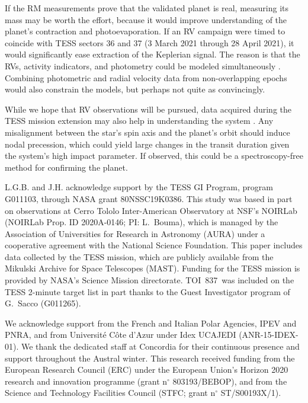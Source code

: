 \documentclass[12pt,twocolumn,tighten]{aastex63}
\newcommand{\tn}{TOI~837} %
\begin{document}
If the RM measurements prove that the validated planet is real,
measuring its mass may be worth the effort, because it would improve
understanding of the planet's contraction and photoevaporation.  If an
RV campaign were timed to coincide with TESS sectors 36 and 37 (3
March 2021 through 28 April 2021), it would significantly ease
extraction of the Keplerian signal.  The reason is that the RVs,
activity indicators, and photometry could be modeled simultaneously
\citep[{\it e.g.},][]{aigrain_simple_2012,rajpaul_gaussian_2015}.
Combining photometric and radial velocity data from non-overlapping
epochs would also constrain the models, but perhaps not quite as
convincingly.

While we hope that RV observations will be pursued, data acquired
during the TESS mission extension may also help in understanding the
system \citep{bouma_extend_2017,huang_expected_2018}.  Any
misalignment between the star's spin axis and the planet's orbit
should induce nodal precession, which could yield large changes in the
transit duration given the system's high impact parameter.  If
observed, this could be a spectroscopy-free method for confirming the
planet.





\acknowledgements
\raggedbottom

L.G.B. and J.H. acknowledge support by the TESS GI Program, program
G011103, through NASA grant 80NSSC19K0386.
%
This study was based in part on observations at Cerro Tololo
Inter-American Observatory at NSF’s NOIRLab (NOIRLab Prop. ID
2020A-0146; PI: L{.}~Bouma), which is managed by the Association of
Universities for Research in Astronomy (AURA) under a cooperative
agreement with the National Science Foundation.
%
This paper includes data collected by the TESS mission, which are
publicly available from the Mikulski Archive for Space Telescopes
(MAST).
%
Funding for the TESS mission is provided by NASA's Science Mission
directorate.  \tn\ was included on the TESS 2-minute target list in
part thanks to the Guest Investigator program of G.\ Sacco (G011265).
%

We acknowledge support from the French and Italian Polar Agencies,
IPEV and PNRA, and from Universit\'e C\^ote d’Azur under Idex UCAJEDI
(ANR-15-IDEX-01). We thank the dedicated staff at Concordia for their
continuous presence and support throughout the Austral winter.
%
This research received funding from the European Research Council
(ERC) under the European Union's Horizon 2020 research and innovation
programme (grant n$^\circ$ 803193/BEBOP), and from the
Science and Technology Facilities Council (STFC; grant n$^\circ$
ST/S00193X/1).
%
%
\end{document}
